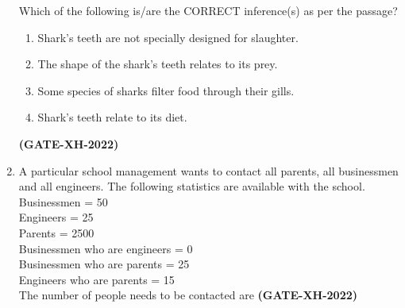 \documentclass[journal]{IEEEtran}
\begin{document}
\begin{enumerate}
Which of the following is/are the CORRECT inference(s) as per the passage?

\begin{enumerate}
\item Shark’s teeth are not specially designed for slaughter.
\item The shape of the shark’s teeth relates to its prey.
\item Some species of sharks filter food through their gills.
\item Shark’s teeth relate to its diet.
\end{enumerate}
\hfill\textbf{(GATE-XH-2022)}

\item A particular school management wants to contact all parents, all businessmen and all engineers. The following statistics are available with the school.\\
Businessmen = 50\\
Engineers = 25\\
Parents = 2500\\
Businessmen who are engineers = 0\\
Businessmen who are parents = 25\\
Engineers who are parents = 15\\
The number of people needs to be contacted are \underline{\hspace{2cm}}
\hfill\textbf{(GATE-XH-2022)}

\end{enumerate}
\end{document}
